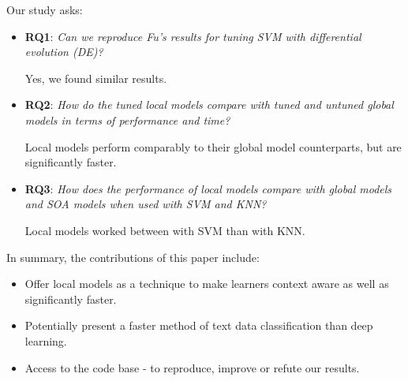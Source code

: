\documentclass[sigconf]{acmart}
\theoremstyle{break}
\begin{document}
    Our study asks:
    \begin{itemize}
        \item 
            \textbf{RQ1}:  {\em Can we reproduce Fu’s results for tuning SVM with differential evolution (DE)?} 
            \begin{lesson}
                Yes, we found similar results.
            \end{lesson}
        \item 
            \textbf{RQ2}: {\em   How do the tuned local models compare with tuned and untuned global models in terms of performance and time?} 
            \begin{lesson}
                Local models perform comparably to their global model counterparts, but are significantly faster.
            \end{lesson}
        \item 
            \textbf{RQ3}: {\em   How does the performance of local models compare with global models and SOA models when used with SVM and KNN?} 
            \begin{lesson}  
                Local models worked between with SVM than with KNN.
            \end{lesson}
    \end{itemize}
    In summary, the contributions of this paper include:
    \begin{itemize}
        \item Offer local models as a technique to make learners context aware as well as significantly faster.
        \item Potentially present a faster method of text data classification than deep learning.
        \item Access to the code base - to reproduce, improve or refute our results.
    \end{itemize}
\end{document}
